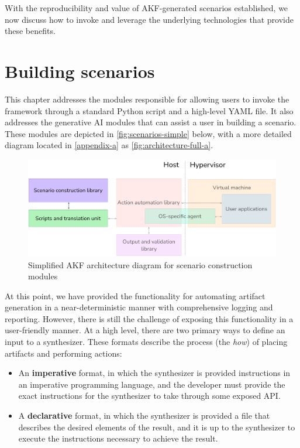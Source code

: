 \documentclass[letterpaper,12pt]{report}
\def\tightlist{}
\begin{document}
With the reproducibility and value of AKF-generated scenarios
established, we now discuss how to invoke and leverage the underlying
technologies that provide these benefits.

\chapter{Building scenarios}\label{chapter-six}

This chapter addresses the modules responsible for allowing users to
invoke the framework through a standard Python script and a high-level
YAML file. It also addresses the generative AI modules that can assist a
user in building a scenario. These modules are depicted in
\autoref{fig:scenarios-simple} below, with a more detailed diagram
located in \autoref{appendix-a} as
\autoref{fig:architecture-full-a}.

\begin{figure}[htbp]
\centering
\includegraphics[width=1\linewidth]{scenarios-simple.png}
\caption{Simplified AKF architecture diagram for scenario construction
modules}\label{fig:scenarios-simple}
\end{figure}

At this point, we have provided the functionality for automating
artifact generation in a near-deterministic manner with comprehensive
logging and reporting. However, there is still the challenge of exposing
this functionality in a user-friendly manner. At a high level, there are
two primary ways to define an input to a synthesizer. These formats
describe the process (the \emph{how}) of placing artifacts and
performing actions:

\begin{itemize}
\tightlist
\item
  An \textbf{imperative} format, in which the synthesizer is provided
  instructions in an imperative programming language, and the developer
  must provide the exact instructions for the synthesizer to take
  through some exposed API.
\item
  A \textbf{declarative} format, in which the synthesizer is provided a
  file that describes the desired elements of the result, and it is up
  to the synthesizer to execute the instructions necessary to achieve
  the result.
\end{itemize}
\end{document}

